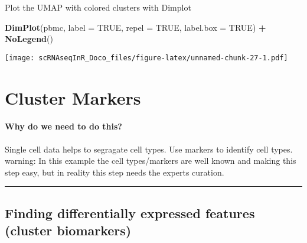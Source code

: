\documentclass[
]{book}
\newenvironment{Shaded}{\begin{snugshade}}{\end{snugshade}}
\newcommand{\AttributeTok}[1]{\textcolor[rgb]{0.13,0.29,0.53}{#1}}
\newcommand{\CommentTok}[1]{\textcolor[rgb]{0.56,0.35,0.01}{\textit{#1}}}
\newcommand{\ConstantTok}[1]{\textcolor[rgb]{0.56,0.35,0.01}{#1}}
\newcommand{\FloatTok}[1]{\textcolor[rgb]{0.00,0.00,0.81}{#1}}
\newcommand{\FunctionTok}[1]{\textcolor[rgb]{0.13,0.29,0.53}{\textbf{#1}}}
\newcommand{\NormalTok}[1]{#1}
\newcommand{\OtherTok}[1]{\textcolor[rgb]{0.56,0.35,0.01}{#1}}
\newcommand{\SpecialCharTok}[1]{\textcolor[rgb]{0.81,0.36,0.00}{\textbf{#1}}}
\begin{document}
\begin{Shaded}
\end{Shaded}

Plot the UMAP with colored clusters with Dimplot

\begin{Shaded}
\begin{Highlighting}[]
\FunctionTok{DimPlot}\NormalTok{(pbmc, }\AttributeTok{label =} \ConstantTok{TRUE}\NormalTok{, }\AttributeTok{repel =} \ConstantTok{TRUE}\NormalTok{, }\AttributeTok{label.box =} \ConstantTok{TRUE}\NormalTok{) }\SpecialCharTok{+} \FunctionTok{NoLegend}\NormalTok{()}
\end{Highlighting}
\end{Shaded}

\texttt{[image: scRNAseqInR\_Doco\_files/figure-latex/unnamed-chunk-27-1.pdf]}

\hypertarget{clustermarkers}{%
\chapter{Cluster Markers}\label{clustermarkers}}

\hypertarget{why-do-we-need-to-do-this-1}{%
\subsubsection*{Why do we need to do this?}\label{why-do-we-need-to-do-this-1}}

Single cell data helps to segragate cell types. Use markers to identify cell types. warning: In this example the cell types/markers are well known and making this step easy, but in reality this step needs the experts curation.

\begin{center}\rule{0.5\linewidth}{0.5pt}\end{center}

\hypertarget{finding-differentially-expressed-features-cluster-biomarkers}{%
\section{Finding differentially expressed features (cluster biomarkers)}\label{finding-differentially-expressed-features-cluster-biomarkers}}
\end{document}
